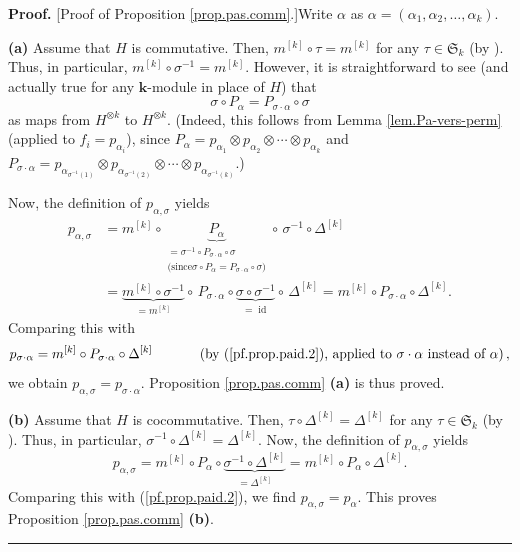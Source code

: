 \documentclass[numbers=enddot,12pt,final,onecolumn,notitlepage]{scrartcl}%
\theoremstyle{definition}
\newenvironment{proof}[1][Proof]{\noindent\textbf{#1.} }{\ \rule{0.5em}{0.5em}}
\begin{document}
\begin{proof}
[Proof of Proposition \ref{prop.pas.comm}.]Write $\alpha$ as $\alpha=\left(
\alpha_{1},\alpha_{2},\ldots,\alpha_{k}\right)  $. \medskip

\textbf{(a)} Assume that $H$ is commutative. Then, $m^{\left[  k\right]
}\circ\tau=m^{\left[  k\right]  }$ for any $\tau\in\mathfrak{S}_{k}$ (by
\cite[Exercise 1.5.10]{GriRei}). Thus, in particular, $m^{\left[  k\right]
}\circ\sigma^{-1}=m^{\left[  k\right]  }$. However, it is straightforward to
see (and actually true for any $\mathbf{k}$-module in place of $H$) that%
\[
\sigma\circ P_{\alpha}=P_{\sigma\cdot\alpha}\circ\sigma
\]
as maps from $H^{\otimes k}$ to $H^{\otimes k}$. (Indeed, this follows from
Lemma \ref{lem.Pa-vers-perm} (applied to $f_{i}=p_{\alpha_{i}}$), since
$P_{\alpha}=p_{\alpha_{1}}\otimes p_{\alpha_{2}}\otimes\cdots\otimes
p_{\alpha_{k}}$ and $P_{\sigma\cdot\alpha}=p_{\alpha_{\sigma^{-1}\left(
1\right)  }}\otimes p_{\alpha_{\sigma^{-1}\left(  2\right)  }}\otimes
\cdots\otimes p_{\alpha_{\sigma^{-1}\left(  k\right)  }}$.)

Now, the definition of $p_{\alpha,\sigma}$ yields%
\begin{align*}
p_{\alpha,\sigma}  &  =m^{\left[  k\right]  }\circ\underbrace{P_{\alpha}%
}_{\substack{=\sigma^{-1}\circ P_{\sigma\cdot\alpha}\circ\sigma\\\text{(since
}\sigma\circ P_{\alpha}=P_{\sigma\cdot\alpha}\circ\sigma\text{)}}%
}\circ\,\sigma^{-1}\circ\Delta^{\left[  k\right]  }\\
&  =\underbrace{m^{\left[  k\right]  }\circ\sigma^{-1}}_{=m^{\left[  k\right]
}}\circ\,P_{\sigma\cdot\alpha}\circ\underbrace{\sigma\circ\sigma^{-1}%
}_{=\operatorname*{id}}\circ\,\Delta^{\left[  k\right]  }=m^{\left[  k\right]
}\circ P_{\sigma\cdot\alpha}\circ\Delta^{\left[  k\right]  }.
\end{align*}
Comparing this with%
\[
p_{\sigma\cdot\alpha}=m^{\left[  k\right]  }\circ P_{\sigma\cdot\alpha}%
\circ\Delta^{\left[  k\right]  }\ \ \ \ \ \ \ \ \ \ \left(  \text{by
(\ref{pf.prop.paid.2}), applied to }\sigma\cdot\alpha\text{ instead of }%
\alpha\right)  ,
\]
we obtain $p_{\alpha,\sigma}=p_{\sigma\cdot\alpha}$. Proposition
\ref{prop.pas.comm} \textbf{(a)} is thus proved. \medskip

\textbf{(b)} Assume that $H$ is cocommutative. Then, $\tau\circ\Delta^{\left[
k\right]  }=\Delta^{\left[  k\right]  }$ for any $\tau\in\mathfrak{S}_{k}$ (by
\cite[Exercise 1.5.10]{GriRei}). Thus, in particular, $\sigma^{-1}\circ
\Delta^{\left[  k\right]  }=\Delta^{\left[  k\right]  }$. Now, the definition
of $p_{\alpha,\sigma}$ yields%
\[
p_{\alpha,\sigma}=m^{\left[  k\right]  }\circ P_{\alpha}\circ
\underbrace{\sigma^{-1}\circ\Delta^{\left[  k\right]  }}_{=\Delta^{\left[
k\right]  }}=m^{\left[  k\right]  }\circ P_{\alpha}\circ\Delta^{\left[
k\right]  }.
\]
Comparing this with (\ref{pf.prop.paid.2}), we find $p_{\alpha,\sigma
}=p_{\alpha}$. This proves Proposition \ref{prop.pas.comm} \textbf{(b)}.
\end{proof}
\end{document}
